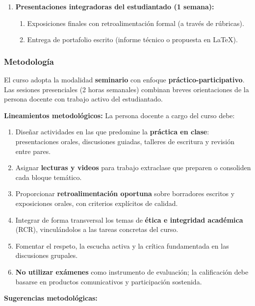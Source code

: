 \begin{refsection}
\begin{enumerate}
\item \textbf{Presentaciones integradoras del estudiantado (1 semana):}
\begin{enumerate}
    \item Exposiciones finales con retroalimentación formal (a través de rúbricas).
    \item Entrega de portafolio escrito (informe técnico o propuesta en \LaTeX{}).
\end{enumerate}

\end{enumerate}

\subsubsection*{Metodología}

El curso adopta la modalidad \textbf{seminario} con enfoque \textbf{práctico-participativo}. Las sesiones presenciales (2 horas semanales) combinan breves orientaciones de la persona docente con trabajo activo del estudiantado.

\noindent\textbf{Lineamientos metodológicos:} La persona docente a cargo del curso debe:

\begin{enumerate}
    \item Diseñar actividades en las que predomine la \textbf{práctica en clase}: presentaciones orales, discusiones guiadas, talleres de escritura y revisión entre pares.
    \item Asignar \textbf{lecturas y videos} para trabajo extraclase que preparen o consoliden cada bloque temático.
    \item Proporcionar \textbf{retroalimentación oportuna} sobre borradores escritos y exposiciones orales, con criterios explícitos de calidad.
    \item Integrar de forma transversal los temas de \textbf{ética e integridad académica} (RCR), vinculándolos a las tareas concretas del curso.
    \item Fomentar el respeto, la escucha activa y la crítica fundamentada en las discusiones grupales.
    \item \textbf{No utilizar exámenes} como instrumento de evaluación; la calificación debe basarse en productos comunicativos y participación sostenida.
\end{enumerate}

\textbf{Sugerencias metodológicas:}


\end{refsection}
